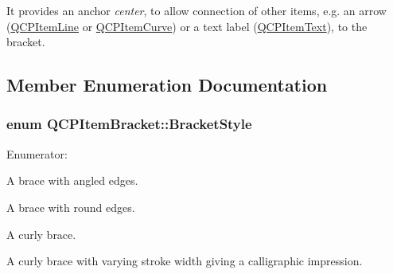 \-It provides an anchor {\itshape center\/}, to allow connection of other items, e.\-g. an arrow (\hyperlink{classQCPItemLine}{\-Q\-C\-P\-Item\-Line} or \hyperlink{classQCPItemCurve}{\-Q\-C\-P\-Item\-Curve}) or a text label (\hyperlink{classQCPItemText}{\-Q\-C\-P\-Item\-Text}), to the bracket. 

\subsection{\-Member \-Enumeration \-Documentation}
\hypertarget{classQCPItemBracket_a7ac3afd0b24a607054e7212047d59dbd}{
\subsubsection[{\-Bracket\-Style}]{\setlength{\rightskip}{0pt plus 5cm}enum {\bf \-Q\-C\-P\-Item\-Bracket\-::\-Bracket\-Style}}}\label{classQCPItemBracket_a7ac3afd0b24a607054e7212047d59dbd}
\begin{Desc}
\item[\-Enumerator\-: ]\par
\begin{description}
\item[{\em 
\hypertarget{classQCPItemBracket_a7ac3afd0b24a607054e7212047d59dbda7f9df4a7359bfe3dac1dbe4ccf5d220c}{bs\-Square}\label{classQCPItemBracket_a7ac3afd0b24a607054e7212047d59dbda7f9df4a7359bfe3dac1dbe4ccf5d220c}
}]\-A brace with angled edges. \item[{\em 
\hypertarget{classQCPItemBracket_a7ac3afd0b24a607054e7212047d59dbda394627b0830a26ee3e0a02ca67a9f918}{bs\-Round}\label{classQCPItemBracket_a7ac3afd0b24a607054e7212047d59dbda394627b0830a26ee3e0a02ca67a9f918}
}]\-A brace with round edges. \item[{\em 
\hypertarget{classQCPItemBracket_a7ac3afd0b24a607054e7212047d59dbda5024ce4023c2d8de4221f1cd4816acd8}{bs\-Curly}\label{classQCPItemBracket_a7ac3afd0b24a607054e7212047d59dbda5024ce4023c2d8de4221f1cd4816acd8}
}]\-A curly brace. \item[{\em 
\hypertarget{classQCPItemBracket_a7ac3afd0b24a607054e7212047d59dbda8f29f5ef754e2dc9a9efdedb2face0f3}{bs\-Calligraphic}\label{classQCPItemBracket_a7ac3afd0b24a607054e7212047d59dbda8f29f5ef754e2dc9a9efdedb2face0f3}
}]\-A curly brace with varying stroke width giving a calligraphic impression. \end{description}
\end{Desc}
